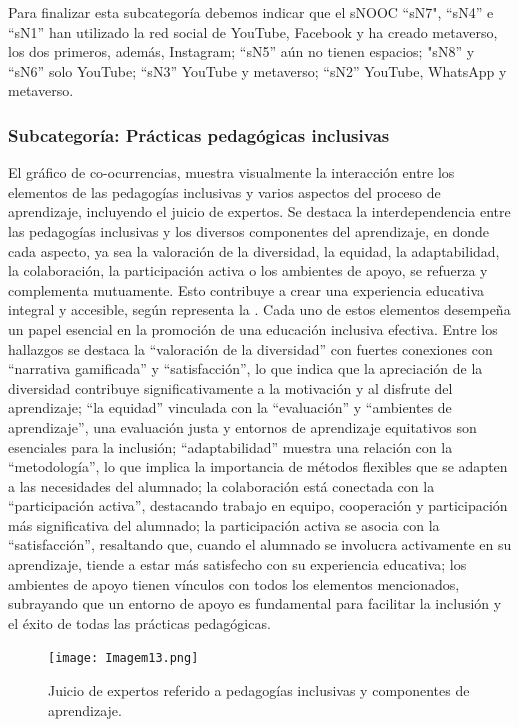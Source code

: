 Para finalizar esta subcategoría debemos indicar que el sNOOC ``sN7",
``sN4'' e ``sN1'' han utilizado la red social de YouTube, Facebook y ha
creado metaverso, los dos primeros, además, Instagram; ``sN5'' aún no
tienen espacios; "sN8'' y ``sN6'' solo YouTube; ``sN3'' YouTube y
metaverso; ``sN2'' YouTube, WhatsApp y metaverso.
	

\subsubsection{Subcategoría: Prácticas pedagógicas inclusivas}\label{sub-sub-sec-subcategoría}
	
El gráfico de co-ocurrencias, muestra visualmente la interacción entre
los elementos de las pedagogías inclusivas y varios aspectos del proceso
de aprendizaje, incluyendo el juicio de expertos. Se destaca la
interdependencia entre las pedagogías inclusivas y los diversos
componentes del aprendizaje, en donde cada aspecto, ya sea la valoración
de la diversidad, la equidad, la adaptabilidad, la colaboración, la
participación activa o los ambientes de apoyo, se refuerza y complementa
mutuamente. Esto contribuye a crear una experiencia educativa integral y
accesible, según representa la . Cada uno de estos elementos
desempeña un papel esencial en la promoción de una educación inclusiva
efectiva. Entre los hallazgos se destaca la ``valoración de la
diversidad'' con fuertes conexiones con ``narrativa gamificada'' y
``satisfacción'', lo que indica que la apreciación de la diversidad
contribuye significativamente a la motivación y al disfrute del
aprendizaje; ``la equidad'' vinculada con la ``evaluación'' y
``ambientes de aprendizaje'', una evaluación justa y entornos de
aprendizaje equitativos son esenciales para la inclusión;
``adaptabilidad'' muestra una relación con la ``metodología'', lo que
implica la importancia de métodos flexibles que se adapten a las
necesidades del alumnado; la colaboración está conectada con la
``participación activa'', destacando trabajo en equipo, cooperación y
participación más significativa del alumnado; la participación activa se
asocia con la ``satisfacción'', resaltando que, cuando el alumnado se
involucra activamente en su aprendizaje, tiende a estar más satisfecho
con su experiencia educativa; los ambientes de apoyo tienen vínculos con
todos los elementos mencionados, subrayando que un entorno de apoyo es
fundamental para facilitar la inclusión y el éxito de todas las
prácticas pedagógicas.
	
\begin{figure}[htbp]
\centering
\begin{minipage}{\textwidth}
\caption{Juicio de expertos referido a pedagogías inclusivas y componentes de aprendizaje.}
\label{fig-13}
\texttt{[image: Imagem13.png]}
\end{minipage}
\end{figure}

